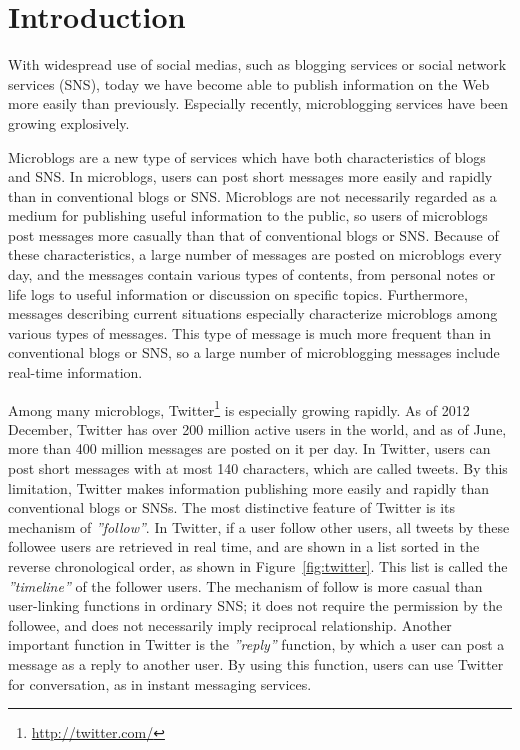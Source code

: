 \section{Introduction}
\label{sec:Introduction}

With widespread use of social medias, such as blogging services or social
network services (SNS), today we have become able to publish information
on the Web more easily than previously.  Especially recently,
microblogging services have been growing explosively.

Microblogs are a new type of services which have both characteristics of
blogs and SNS.  In microblogs, users can post short messages more easily
and rapidly than in conventional blogs or SNS.  Microblogs are not
necessarily regarded as a medium for publishing useful information to
the public, so users of microblogs post messages more casually than that
of conventional blogs or SNS.  Because of these characteristics, a large
number of messages are posted on microblogs every day, and the messages
contain various types of contents, from personal notes or life logs to
useful information or discussion on specific topics. Furthermore,
messages describing current situations especially characterize
microblogs among various types of messages.  This type of message is
much more frequent than in conventional blogs or SNS, so a large number
of microblogging messages include real-time information.

Among many microblogs,
Twitter\footnote{\url{http://twitter.com/}} is especially growing
rapidly.  As of 2012 December, Twitter has over 200 million active users
in the world\cite{TwitterUsers}, and as of June, more than 400 million
messages are posted on it per day\cite{TweetsPerDay}.  In Twitter, users
can post short messages with at most 140 characters, which are called
tweets.  By this limitation, Twitter makes information publishing more
easily and rapidly than conventional blogs or SNSs.  The
most distinctive feature of Twitter is its mechanism of
\emph{''follow''}.  In Twitter, if a user follow other users, all tweets
by these followee users are retrieved in real time, and are shown in a
list sorted in the reverse chronological order, as shown in
Figure~\ref{fig:twitter}.  This list is called the \emph{''timeline''}
of the follower users.  The mechanism of follow is more casual than
user-linking functions in ordinary SNS; it does not require the
permission by the followee, and does not necessarily imply reciprocal
relationship. Another important function in Twitter is the
\emph{''reply''} function, by which a user can post a message as a reply
to another user.  By using this function, users can use Twitter for
conversation, as in instant messaging services.

